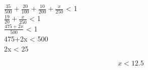\newpage

\begin{question}
        
    $\frac{35}{500} + \frac{20}{100} + \frac{10}{200} + \frac{x}{250}$ < 1 \\

    $\frac{19}{20} + \frac{x}{250}$ < 1 \\

    $\frac{475+2x}{500}$ < 1 \\

    475+2x < 500 \\

    2x < 25 

    \begin{equation*}
        x < 12.5
    \end{equation*}

\end{question}
